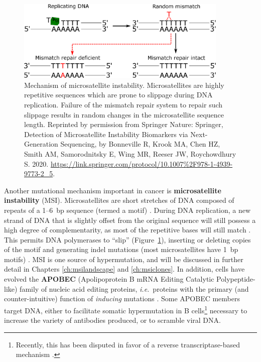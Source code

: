 \begin{figure}[htb]
    \centering
    \includegraphics[width=0.9\textwidth,keepaspectratio]{images/intro/msi_schematic}
    \caption[Mechanism of microsatellite instability.]{Mechanism of microsatellite instability. Microsatellites are highly repetitive sequences which are prone to slippage during DNA replication. Failure of the mismatch repair system to repair such slippage results in random changes in the microsatellite sequence length. Reprinted by permission from Springer Nature: Springer, Detection of Microsatellite Instability Biomarkers via Next-Generation Sequencing, by Bonneville R, Krook MA, Chen HZ, Smith AM, Samorodnitsky E, Wing MR, Reeser JW, Roychowdhury S\@. \textcopyright{} 2020. \url{https://link.springer.com/protocol/10.1007\%2F978-1-4939-9773-2_5}.}
    \label{fig:intro:msi_schematic}
\end{figure}
Another mutational mechanism important in cancer is \textbf{microsatellite instability} (MSI). Microsatellites are short stretches of DNA composed of repeats of a 1--6~bp sequence (termed a motif) \cite{kelkar2010}. During DNA replication, a new strand of DNA that is slightly offset from the original sequence will still possess a high degree of complementarity, as most of the repetitive bases will still match \cite{levinson1987}. This permits DNA polymerases to ``slip'' (Figure~\ref{fig:intro:msi_schematic}), inserting or deleting copies of the motif and generating indel mutations (most microsatellites have 1~bp motifs) \cite{schloetterer1992}. MSI is one source of hypermutation, and will be discussed in further detail in Chapters \ref{ch:msilandscape} and \ref{ch:msiclones}. In addition, cells have evolved the \textbf{APOBEC} (Apolipoprotein B mRNA Editing Catalytic Polypeptide-like) family of nucleic acid editing proteins, \textit{i.e.}\ proteins with the primary (and counter-intuitive) function of \emph{inducing} mutations \cite{salter2016}. Some APOBEC members target DNA, either to facilitate somatic hypermutation in B cells\footnote{Recently, this has been disputed in favor of a reverse transcriptase-based mechanism \cite{steele2016}.} necessary to increase the variety of antibodies produced, or to scramble viral DNA.

